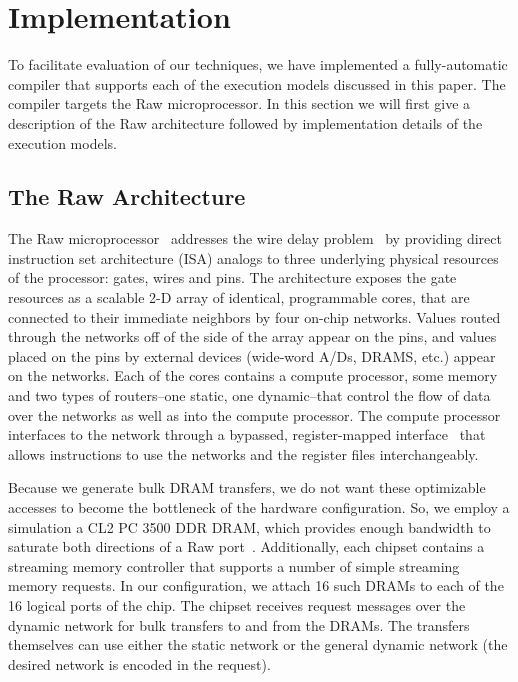 \section{Implementation} 

To facilitate evaluation of our techniques, we have implemented a
fully-automatic compiler that supports each of the execution models
discussed in this paper.  The compiler targets the Raw
microprocessor.  In this section we will first give a description of
the Raw architecture followed by implementation details of the 
execution models.

\subsection{The Raw Architecture}
\label{sec:raw}

The Raw microprocessor~\cite{raw10,raw} addresses the wire delay
problem~\cite{raw13} by providing direct instruction set architecture
(ISA) analogs to three underlying physical resources of the processor:
gates, wires and pins. The architecture exposes the gate resources as
a scalable 2-D array of identical, programmable cores, that are
connected to their immediate neighbors by four on-chip networks.
Values routed through the networks off of the side of the array appear
on the pins, and values placed on the pins by external devices
(wide-word A/Ds, DRAMS, etc.) appear on the networks.  Each of the
cores contains a compute processor, some memory and two types of
routers--one static, one dynamic--that control the flow of data over
the networks as well as into the compute processor.  The compute
processor interfaces to the network through a bypassed,
register-mapped interface~\cite{raw10} that allows instructions to use
the networks and the register files interchangeably.

Because we generate bulk DRAM transfers, we do not want these
optimizable accesses to become the bottleneck of the hardware
configuration.  So, we employ a simulation a CL2 PC 3500 DDR DRAM,
which provides enough bandwidth to saturate both directions of a Raw
port~\cite{raw_isca}.  Additionally, each chipset contains a streaming
memory controller that supports a number of simple streaming memory
requests. In our configuration, we attach 16 such DRAMs to each of the
16 logical ports of the chip.  The chipset receives request messages
over the dynamic network for bulk transfers to and from the DRAMs.
The transfers themselves can use either the static network or the
general dynamic network (the desired network is encoded in the
request).

